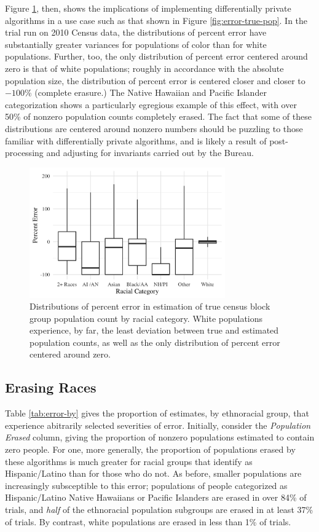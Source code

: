 Figure \ref{fig:error-by-race}, then, shows the implications of implementing differentially private algorithms in a use case such as that shown in Figure \ref{fig:error-true-pop}. In the trial run on 2010 Census data, the distributions of percent error have substantially greater variances for populations of color than for white populations. Further, too, the only distribution of percent error centered around zero is that of white populations; roughly in accordance with the absolute population size, the distribution of percent error is centered closer and closer to $-100$\% (complete erasure.) The Native Hawaiian and Pacific Islander categorization shows a particularly egregious example of this effect, with over 50\% of nonzero population counts completely erased. The fact that some of these distributions are centered around nonzero numbers should be puzzling to those familiar with differentially private algorithms, and is likely a result of post-processing and adjusting for invariants carried out by the Bureau.

\begin{figure}
   \centering
   \includegraphics[width=0.75\textwidth]{figures/error_by_race.png}
   \caption{Distributions of percent error in estimation of true census block group population count by racial category. White populations experience, by far, the least deviation between true and estimated population counts, as well as the only distribution of percent error centered around zero.}
   \label{fig:error-by-race}
\end{figure}
 
\subsection{Erasing Races}\label{sec:erase}

Table \ref{tab:error-by} gives the proportion of estimates, by ethnoracial group, that experience abitrarily selected severities of error. Initially, consider the \textit{Population Erased} column, giving the proportion of nonzero populations estimated to contain zero people. For one, more generally, the proportion of populations erased by these algorithms is much greater for racial groups that identify as Hispanic/Latino than for those who do not. As before, smaller populations are increasingly subsceptible to this error; populations of people categorized as Hispanic/Latino Native Hawaiians or Pacific Islanders are erased in over 84\% of trials, and \textit{half} of the ethnoracial population subgroups are erased in at least 37\% of trials. By contrast, white populations are erased in less than 1\% of trials.

